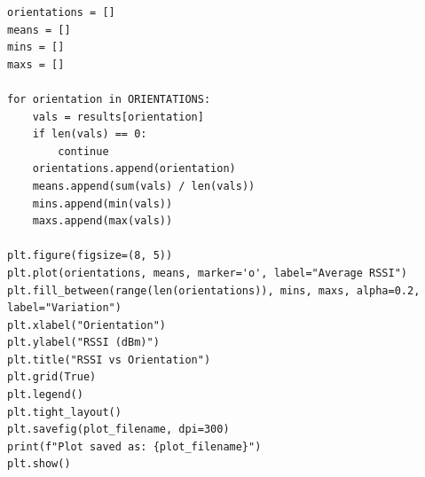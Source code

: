 \begin{lstlisting}[style=appendix-py, caption={RSSI vs.\ antenna orientation}, label={lst:orientation}]
orientations = []
means = []
mins = []
maxs = []

for orientation in ORIENTATIONS:
    vals = results[orientation]
    if len(vals) == 0:
        continue
    orientations.append(orientation)
    means.append(sum(vals) / len(vals))
    mins.append(min(vals))
    maxs.append(max(vals))

plt.figure(figsize=(8, 5))
plt.plot(orientations, means, marker='o', label="Average RSSI")
plt.fill_between(range(len(orientations)), mins, maxs, alpha=0.2, label="Variation")
plt.xlabel("Orientation")
plt.ylabel("RSSI (dBm)")
plt.title("RSSI vs Orientation")
plt.grid(True)
plt.legend()
plt.tight_layout()
plt.savefig(plot_filename, dpi=300)
print(f"Plot saved as: {plot_filename}")
plt.show()
\end{lstlisting}

